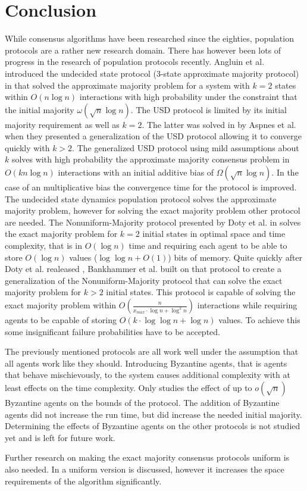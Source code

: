 \section{Conclusion} 
While consensus algorithms have been researched since the eighties, population protocols are a rather new research domain. There has however been lots of progress in the research of population protocols recently. Angluin et al. introduced the undecided state protocol (3-state approximate majority protocol) in \cite{angluinSimplePopulationProtocol2008} that solved the approximate majority problem for a system with $k = 2$ states within $O(n \log n)$ interactions with high probability under the constraint that the initial majority $\omega(\sqrt{n} \log n)$. The USD protocol is limited by its initial majority requirement as well as $k = 2$. The latter was solved in \cite{AspnesFastConverganceOfKOpinion2023} by Aspnes et al. when they presented a generalization of the USD protocol allowing it to converge quickly with $k > 2$. The generalized USD protocol using mild assumptions about $k$ solves with high probability the approximate majority consensus problem in $O(k n \log n)$ interactions with an initial additive bias of $\Omega(\sqrt{n} \log n)$. In the case of an multiplicative bias the convergence time for the protocol is improved. The undecided state dynamics population protocol solves the approximate majority problem, however for solving the exact majority problem other protocol are needed. The Nonuniform-Majority protocol presented by Doty et al. in \cite{dotyTimeSpaceOptimal2022} solves the exact majority problem for $k = 2$ initial states in optimal space and time complexity, that is in $O(\log n)$ time and requiring each agent to be able to store $O(\log n)$ values ($\log \log n + O(1)$) bits of memory. Quite quickly after Doty et al. realeased \cite{dotyTimeSpaceOptimal2022}, Bankhammer et al. \cite{bankhamerPopulationProtocolsExact2022} built on that protocol to create a generalization of the Nonuniform-Majority protocol that can solve the exact majority problem for $k > 2$ initial states. This protocol is capable of solving the exact majority problem within $O(\frac{n}{x_{max} \cdot \log n + \log^2 n})$ interactions while requiring agents to be capable of storing $O(k \cdot \log \log n + \log n)$ values. To achieve this some insignificant failure probabilities have to be accepted.

 The previously mentioned protocols are all work well under the assumption that all agents work like they should. Introducing Byzantine agents, that is agents that behave mischievously, to the system causes additional complexity with at least effects on the time complexity. Only \cite{angluinSimplePopulationProtocol2008} studies the effect of up to $o(\sqrt{n})$ Byzantine agents on the bounds of the protocol. The addition of Byzantine agents did not increase the run time, but did increase the needed initial majority. Determining the effects of Byzantine agents on the other protocols is not studied yet and is left for future work. 

Further research on making the exact majority consensus protocols uniform is also needed. In \cite{dotyTimeSpaceOptimal2022} a uniform version is discussed, however it increases the space requirements of the algorithm significantly. 